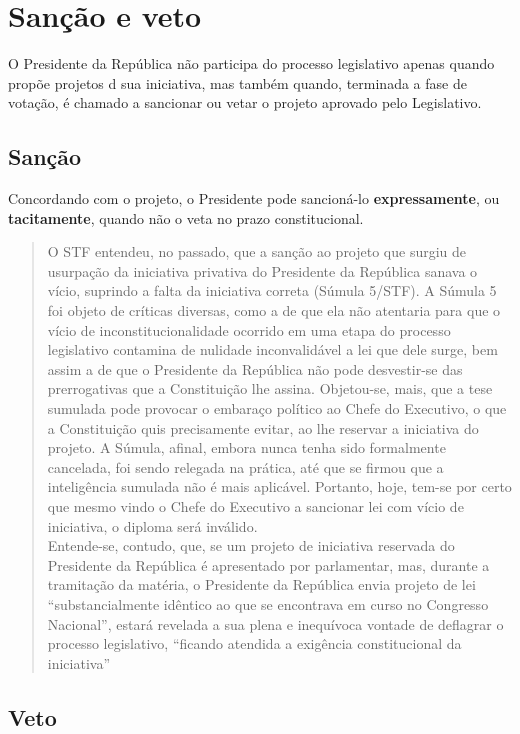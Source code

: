 \documentclass{article}
\begin{document}
\section{Sanção e veto}

O Presidente da República não participa do processo legislativo apenas quando propõe projetos d sua iniciativa, mas também quando, terminada a fase de votação, é chamado a sancionar ou vetar o projeto aprovado pelo Legislativo.

\subsection{Sanção}

Concordando com o projeto, o Presidente pode sancioná-lo \textbf{expressamente}, ou \textbf{tacitamente}, quando não o veta no prazo constitucional.

\begin{quote}
    O STF entendeu, no passado, que a sanção ao projeto que surgiu de usurpação da iniciativa privativa do Presidente da República sanava o vício, suprindo a falta da iniciativa correta (Súmula 5/STF). A Súmula 5 foi objeto de críticas diversas, como a de que ela não atentaria para que o vício de inconstitucionalidade ocorrido em uma etapa do processo legislativo contamina de nulidade inconvalidável a lei que dele surge, bem assim a de que o Presidente da República não pode desvestir-se das prerrogativas que a Constituição lhe assina. Objetou-se, mais, que a tese sumulada pode provocar o embaraço político ao Chefe do Executivo, o que a Constituição quis precisamente evitar, ao lhe reservar a iniciativa do projeto. A Súmula, afinal, embora nunca tenha sido formalmente cancelada, foi sendo relegada na prática, até que se firmou que a inteligência sumulada não é mais aplicável. Portanto, hoje, tem-se por certo que mesmo vindo o Chefe do Executivo a sancionar lei com vício de iniciativa, o diploma será inválido.\\
    Entende-se, contudo, que, se um projeto de iniciativa reservada do Presidente da República é apresentado por parlamentar, mas, durante a tramitação da matéria, o Presidente da República envia projeto de lei ``substancialmente idêntico ao que se encontrava em curso no Congresso Nacional”, estará revelada a sua plena e inequívoca vontade de deflagrar o processo legislativo, ``ficando atendida a exigência constitucional da iniciativa” \cite[p.~1062]{mendes_curso_2024}
\end{quote}

\subsection{Veto}
\end{document}
